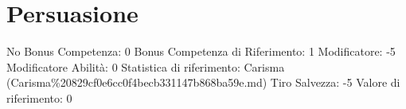 \section{Persuasione}\label{persuasione}

\begin{description}
\tightlist
\item[Tags: ABI]
No Bonus Competenza: 0 Bonus Competenza di Riferimento: 1 Modificatore:
-5 Modificatore Abilità: 0 Statistica di riferimento: Carisma
(Carisma\%20829cf0e6cc0f4becb331147b868ba59e.md) Tiro Salvezza: -5
Valore di riferimento: 0
\end{description}
